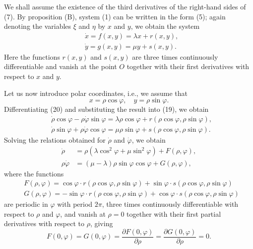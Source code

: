 \documentclass[10pt,a5paper]{book}
\theoremstyle{plain}
\theoremstyle{definition}
\theoremstyle{remark}
\begin{document}
We shall assume the existence of the third derivatives of the right-hand sides of (7). By proposition (B), system (1) can be written in the form (5); again denoting the variables $\xi$ and $\eta$ by $x$ and $y$, we obtain the system
\begin{align*}
& \dot{x}=f(x, y)=\lambda x+r(x, y),  \tag{19}\\
& \dot{y}=g(x, y)=\mu y+s(x, y) .
\end{align*}
Here the functions $r(x, y)$ and $s(x, y)$ are three times continuously differentiable and vanish at the point $O$ together with their first derivatives with respect to $x$ and $y$.

Let us now introduce polar coordinates, i.e., we assume that
\begin{equation*}
x=\rho \cos \varphi, \quad y=\rho \sin \varphi . \tag{20}
\end{equation*}
Differentiating (20) and substituting the result into (19), we obtain
\[
\begin{aligned}
& \dot{\rho} \cos \varphi-\rho \dot{\varphi} \sin \varphi=\lambda \rho \cos \varphi+r(\rho \cos \varphi, \rho \sin \varphi), \\
& \dot{\rho} \sin \varphi+\rho \dot{\varphi} \cos \varphi=\mu \rho \sin \varphi+s(\rho \cos \varphi, \rho \sin \varphi) .
\end{aligned}
\]
Solving the relations obtained for $\dot{\rho}$ and $\dot{\varphi}$, we obtain
\begin{align*}
\dot{\rho} & =\rho\left(\lambda \cos ^{2} \varphi+\mu \sin ^{2} \varphi\right)+F(\rho, \varphi),  \tag{21}\\
\rho \dot{\varphi} & =(\mu-\lambda) \rho \sin \varphi \cos \varphi+G(\rho, \varphi),
\end{align*}
where the functions
\[
\begin{aligned}
& F(\rho, \varphi)=\cos \varphi \cdot r(\rho \cos \varphi, \rho \sin \varphi)+\sin \varphi \cdot s(\rho \cos \varphi, \rho \sin \varphi) \\
& G(\rho, \varphi)=-\sin \varphi \cdot r(\rho \cos \varphi, \rho \sin \varphi)+\cos \varphi \cdot s(\rho \cos \varphi, \rho \sin \varphi)
\end{aligned}
\]
are periodic in $\varphi$ with period $2 \pi$, three times continuously differentiable with respect to $\rho$ and $\varphi$, and vanish at $\rho=0$ together with their first partial derivatives with respect to $\rho$, giving
\begin{equation*}
F(0, \varphi)=G(0, \varphi)=\frac{\partial F(0, \varphi)}{\partial \rho}=\frac{\partial G(0, \varphi)}{\partial \rho}=0 . \tag{22}
\end{equation*}
\end{document}
